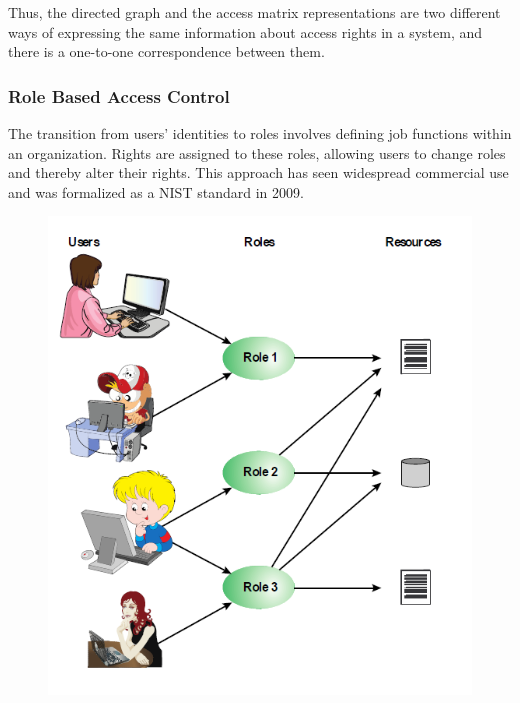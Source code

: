 \documentclass{article}
\begin{document}
                Thus, the directed graph and the access matrix representations are two different ways of expressing the same information about access rights in a system, and there is a one-to-one correspondence between them.
    \subsubsection{Role Based Access Control}
                
        The transition from users' identities to roles involves defining job functions within an organization. Rights are assigned to these roles, allowing users to change roles and thereby alter their rights. This approach has seen widespread commercial use and was formalized as a NIST standard in 2009.

        \begin{figure}[h]
            \begin{center}
                \includegraphics[scale=0.6]{../immagini/urr.png}
            \end{center}
            
        \end{figure}
\end{document}
